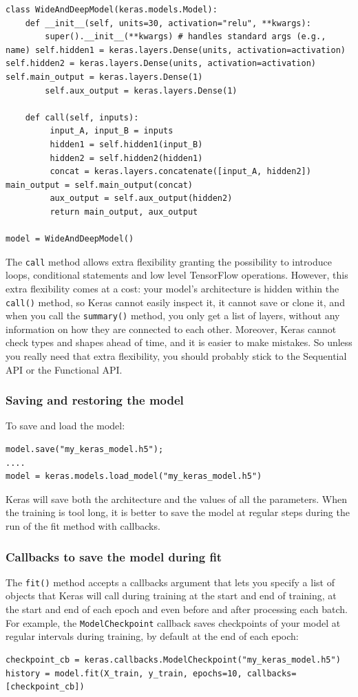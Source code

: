 \documentclass[12pt, letterpaper]{article}
\theoremstyle{definition}
\begin{document}
\begin{lstlisting}
class WideAndDeepModel(keras.models.Model):
    def __init__(self, units=30, activation="relu", **kwargs):
        super().__init__(**kwargs) # handles standard args (e.g., name) self.hidden1 = keras.layers.Dense(units, activation=activation) self.hidden2 = keras.layers.Dense(units, activation=activation) self.main_output = keras.layers.Dense(1)
        self.aux_output = keras.layers.Dense(1)

    def call(self, inputs):
         input_A, input_B = inputs
         hidden1 = self.hidden1(input_B)
         hidden2 = self.hidden2(hidden1)
         concat = keras.layers.concatenate([input_A, hidden2]) main_output = self.main_output(concat)
         aux_output = self.aux_output(hidden2)
         return main_output, aux_output

model = WideAndDeepModel()
\end{lstlisting}
The \lstinline+call+ method allows extra flexibility granting the possibility to introduce loops, conditional statements and low level TensorFlow operations. However, this extra flexibility comes at a cost: your model’s architecture is hidden within the \lstinline+call()+ method, so Keras cannot easily inspect it, it cannot save or clone it, and when you call the \lstinline+summary()+ method, you only get a list of layers, without any information on how they are connected to each other. Moreover, Keras cannot check types and shapes ahead of time, and it is easier to make mistakes. So unless you really need that extra flexibility, you should probably stick to the Sequential API or the Functional API.

\subsubsection{Saving and restoring the model}
To save and load the model:
\begin{lstlisting}
model.save("my_keras_model.h5");
....
model = keras.models.load_model("my_keras_model.h5")
\end{lstlisting}
Keras will save both the architecture and the values of all the parameters. When the training is tool long, it is better to save the model at regular steps during the run of the fit method with callbacks.

\subsubsection{Callbacks to save the model during fit}
The \lstinline+fit()+ method accepts a callbacks argument that lets you specify a list of objects that Keras will call during training at the start and end of training, at the start and end of each epoch and even before and after processing each batch. For example, the \lstinline+ModelCheckpoint+ callback saves checkpoints of your model at regular intervals during training, by default at the end of each epoch:
\begin{lstlisting}
checkpoint_cb = keras.callbacks.ModelCheckpoint("my_keras_model.h5")
history = model.fit(X_train, y_train, epochs=10, callbacks=[checkpoint_cb])
\end{lstlisting}
\end{document}
